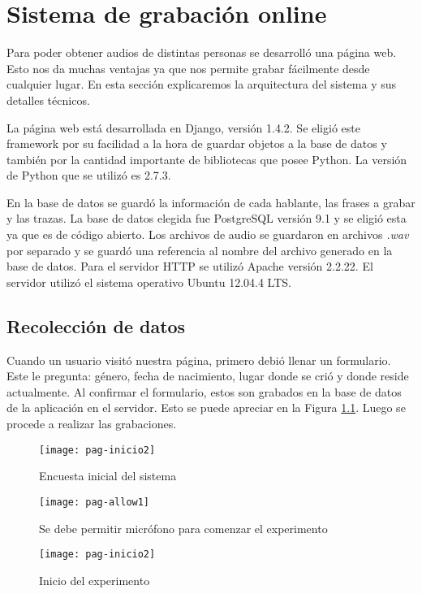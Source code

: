 \chapter{Sistema de grabación online}

Para poder obtener audios de distintas personas se desarrolló una página web. Esto nos da muchas ventajas ya que nos permite grabar fácilmente desde cualquier lugar. En esta sección explicaremos la arquitectura del sistema y sus detalles técnicos.

La página web está desarrollada en Django, versión 1.4.2. Se eligió este framework por su facilidad a la hora de guardar objetos a la base de datos y también por la cantidad importante de bibliotecas que posee Python. La versión de Python que se utilizó es 2.7.3. 

En la base de datos se guardó la información de cada hablante, las frases a grabar y las trazas. La base de datos elegida fue PostgreSQL versión 9.1 y se eligió esta ya que es de código abierto. Los archivos de audio se guardaron en archivos \textit{.wav} por separado y se guardó una referencia al nombre del archivo generado en la base de datos. Para el servidor HTTP se utilizó Apache versión 2.2.22. El servidor utilizó el sistema operativo Ubuntu 12.04.4 LTS.

\section{Recolección de datos}

Cuando un usuario visitó nuestra página, primero debió llenar un formulario. Este le pregunta: género, fecha de nacimiento, lugar donde se crió y donde reside actualmente. Al confirmar el formulario, estos son grabados en la base de datos de la aplicación en el servidor. Esto se puede apreciar en la Figura \ref{figEncuesta}. Luego se procede a realizar las grabaciones. 

\begin{figure}[h!]
    \centerline{\texttt{[image: pag-inicio2]} }
    \caption{Encuesta inicial del sistema}
    \label{figEncuesta}
\end{figure}

\begin{figure}[h!]
    \centerline{\texttt{[image: pag-allow1]} }
    \caption{Se debe permitir micrófono para comenzar el experimento}
    \label{allowmic}
\end{figure}

\begin{figure}[h!]
    \centerline{\texttt{[image: pag-inicio2]} }
    \caption{Inicio del experimento}
    \label{inicio}
\end{figure}

